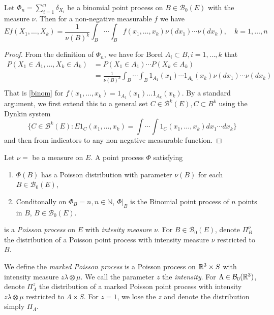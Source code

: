 \begin{proposition}\label{bincalc}
	Let $\Phi_n = \sum^{n}_{i=1}  \delta_{X_i}$ be a binomial point process on $B\in\mathcal B_0(E)$ with the measure $\nu$. Then for a non-negative measurable $f$ we have
\begin{equation}\label{binom}
	Ef(X_1,\dots, X_k) = \frac 1{\nu(B)^k} \int_B \cdots \int_B f(x_1,\dots, x_k) \nu(dx_1) \cdots \nu(dx_k), \quad k = 1,\dots, n
\end{equation}
\end{proposition}
\begin{proof}
From the definition of $\Phi_n$, we have for Borel $A_i \subset B, i=1,\dots,k$ that
\begin{align*}
P(X_1 \in A_1, \dots, X_k \in A_k) &= P(X_1\in A_1)\cdots P(X_k\in A_k) \\ 
& = \frac 1{\nu(B)^k} \int_B \cdots \int_B 1_{A_1}(x_1) \cdots 1_{A_k}(x_k) \nu(dx_1) \cdots \nu(dx_k) \\
\end{align*}
That is \ref{binom} for $f(x_1,\dots,x_k)=1_{A_1}(x_1)\dots 1_{A_k}(x_k)$. By a standard argument, we first extend this to a general set $C \in \mathcal B^k(E), C\subset B^k$ using the Dynkin system 
$$\{C \in \mathcal B^k(E): E 1_C (x_1,\dots,x_k) = \int \cdots \int 1_C(x_1,\dots, x_k) dx_1 \cdots dx_k \}$$
 and then from indicators to any non-negative measurable function.
\end{proof}




\begin{definition} Let $\nu=$ be a measure on $E$. A point process $\Phi$ satisfying
\begin{enumerate}
	\item $\Phi(B)$ has a Poisson distribution with parameter $\nu(B)$ for each $B\in \mathcal B_0(E)$,
	\item Conditonally on $\Phi_B=n, n\in\mathbb N$,  $\Phi|_B$ is the Binomial point process of $n$ points in $B$, $B \in \mathcal B_0(E)$.
\end{enumerate}
is a \textit{Poisson process} on $E$ with \textit{intesity measure} $\nu$.
For $B\in \mathcal B_0(E)$, denote $\Pi^\nu_B$ the distribution of a Poisson point process with intensity measure $\nu$ restricted to $B$.  
\end{definition}

\begin{definition}We define the \textit{marked Poisson process} is a Poisson process on ${\mathbb R^3}\times S$ with intensity measure $z\lambda \otimes \mu$. We call the parameter $z$ the \textit{intensity}.\newline
	For $\Lambda\in \mathcal B_0({\mathbb R^3})$, denote $\Pi^z_\Lambda$ the distribution of a marked Poisson point process with intensity $z\lambda \otimes \mu$ restricted to $\Lambda\times S$. For $z=1$, we lose the $z$ and denote the distribution simply $\Pi_\Lambda$.
\end{definition}

